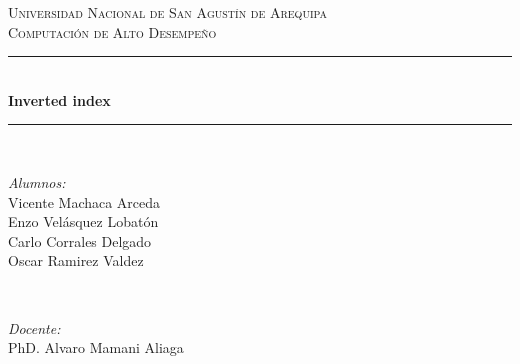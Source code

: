 \documentclass{article}
\newcommand{\csdocente}{Vicente Machaca Arceda \\ Enzo Velásquez Lobatón \\
	Carlo Corrales Delgado\\
	Oscar Ramirez Valdez
	}
\newcommand{\cscurso}{Computación de Alto Desempeño}
\newcommand{\csuniversidad}{Universidad Nacional de San Agustín de Arequipa}
\newcommand{\cstema}{Inverted index}
\begin{document}
	
	
	
	
\begin{titlepage}
	
	\newcommand{\HRule}{\rule{\linewidth}{0.5mm}} %
	
	\center %
	
	
	\textsc{\LARGE \csuniversidad}\\[1.5cm] %
	\textsc{\Large \cscurso}\\[0.5cm] %
	
	
	\vspace{2cm}
	
	\HRule \\[0.4cm]
	{ \huge \bfseries \cstema}\\[0.4cm] %
	\HRule \\[1.5cm]
	
	
	\begin{minipage}{0.4\textwidth}
		\begin{flushleft} \large
			\emph{Alumnos:}\\
			\csdocente
		\end{flushleft}
	\end{minipage}
	~
	\begin{minipage}{0.4\textwidth}
		\begin{flushright} \large
			\emph{Docente:} \\
			PhD. Alvaro Mamani Aliaga
		\end{flushright}
	\end{minipage}\\[2cm]
	

\end{titlepage}
\end{document}
